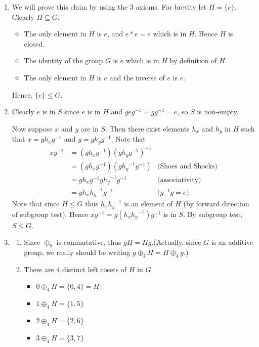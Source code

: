 \begin{enumerate}
    \item We will prove this claim by using the 3 axioms. For brevity let $H = \{e\}$. Clearly $H \subseteq G$.
    \begin{itemize}
        \item The only element in $H$ is $e$, and $e \ast e = e$ which is in $H$. Hence $H$ is closed.
        \item The identity of the group $G$ is $e$ which is in $H$ by definition of $H$.
        \item The only element in $H$ is $e$ and the inverse of $e$ is $e$.
    \end{itemize}
    Hence, $\{e\} \leq G$.

    \item Clearly $e$ is in $S$ since $e$ is in $H$ and $geg^{-1} = gg^{-1} = e$, so $S$ is non-empty.

    Now suppose $x$ and $y$ are in $S$. Then there exist elements $h_x$ and $h_y$ in $H$ such that $x = gh_xg^{-1}$ and $y = gh_yg^{-1}$. Note that
    \begin{align*}
        xy^{-1} &= (gh_xg^{-1})(gh_yg^{-1})^{-1}\\
        &= (gh_xg^{-1})(g{h_y}^{-1}g^{-1}) & \text{(Shoes and Shocks)}\\
        &= gh_xg^{-1}g{h_y}^{-1}g^{-1} & \text{(associativity)}\\
        &= gh_x{h_y}^{-1}g^{-1} & \text{(}g^{-1}g = e\text{)}.
    \end{align*}
    Note that since $H \leq G$ thus $h_x{h_y}^{-1}$ is an element of $H$ (by forward direction of subgroup test). Hence $xy^{-1} = g(h_x{h_y}^{-1})g^{-1}$ is in $S$. By subgroup test, $S \leq G$.

    \item \begin{enumerate}[label=(\alph*)]
        \item Since $\oplus_8$ is commutative, thus $gH = Hg$.\newline(Actually, since $G$ is an additive group, we really should be writing $g \oplus_4 H = H \oplus_4 g$.)
        \item There are 4 distinct left cosets of $H$ in $G$.
        \begin{itemize}
            \item $0 \oplus_4 H = \{0, 4\} = H$
            \item $1 \oplus_4 H = \{1, 5\}$
            \item $2 \oplus_4 H = \{2, 6\}$
            \item $3 \oplus_4 H = \{3, 7\}$
        \end{itemize}
    \end{enumerate}


\end{enumerate}
